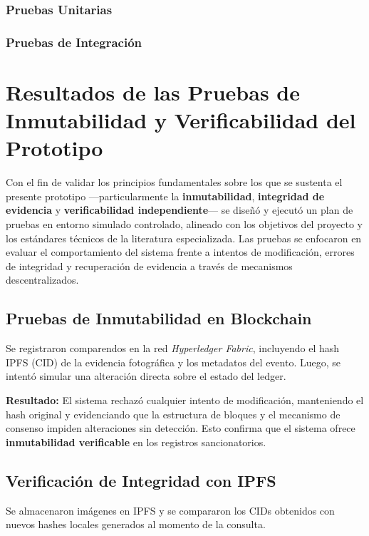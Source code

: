 \documentclass[
    letterpaper, 
    man,   
    spanish,
    12pt,
    donotrepeattitle,
    floatsintext,
    hidelinks %
]{apa7}
\begin{document}
\subsubsection{Pruebas Unitarias}

\subsubsection{Pruebas de Integración}

\section{Resultados de las Pruebas de Inmutabilidad y Verificabilidad del Prototipo}

Con el fin de validar los principios fundamentales sobre los que se sustenta el presente prototipo —particularmente la \textbf{inmutabilidad}, \textbf{integridad de evidencia} y \textbf{verificabilidad independiente}— se diseñó y ejecutó un plan de pruebas en entorno simulado controlado, alineado con los objetivos del proyecto y los estándares técnicos de la literatura especializada. Las pruebas se enfocaron en evaluar el comportamiento del sistema frente a intentos de modificación, errores de integridad y recuperación de evidencia a través de mecanismos descentralizados.

\subsection{Pruebas de Inmutabilidad en Blockchain}

Se registraron comparendos en la red \textit{Hyperledger Fabric}, incluyendo el hash IPFS (CID) de la evidencia fotográfica y los metadatos del evento. Luego, se intentó simular una alteración directa sobre el estado del ledger.

\textbf{Resultado:} El sistema rechazó cualquier intento de modificación, manteniendo el hash original y evidenciando que la estructura de bloques y el mecanismo de consenso impiden alteraciones sin detección. Esto confirma que el sistema ofrece \textbf{inmutabilidad verificable} en los registros sancionatorios.

\subsection{Verificación de Integridad con IPFS}

Se almacenaron imágenes en IPFS y se compararon los CIDs obtenidos con nuevos hashes locales generados al momento de la consulta.
\end{document}
